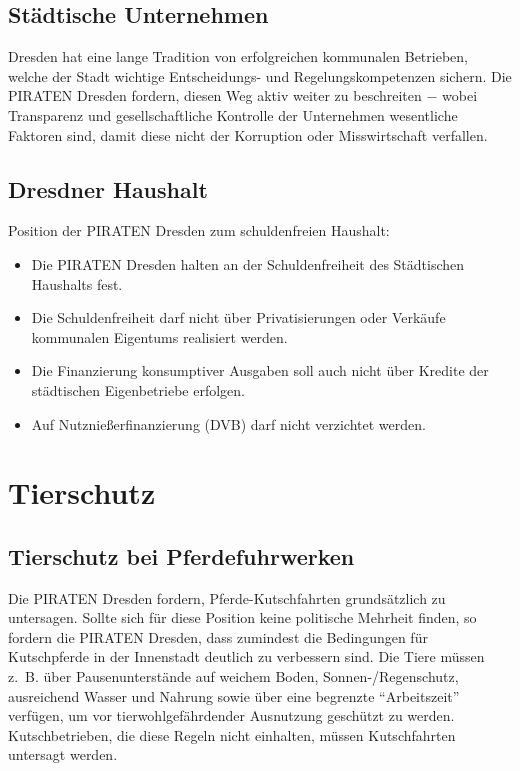 \documentclass[a4paper, 11pt]{article}
\begin{document}
\subsection{Städtische Unternehmen}
Dresden hat eine lange Tradition von erfolgreichen kommunalen Betrieben, welche der Stadt wichtige Entscheidungs- und Regelungskompetenzen sichern. Die PIRATEN Dresden fordern, diesen Weg aktiv weiter zu beschreiten $-$ wobei Transparenz und gesellschaftliche Kontrolle der Unternehmen wesentliche Faktoren sind, damit diese nicht der Korruption oder Misswirtschaft verfallen.


\subsection{Dresdner Haushalt}

Position der PIRATEN Dresden zum schuldenfreien Haushalt:

\begin{itemize}
    \item Die PIRATEN Dresden halten an der Schuldenfreiheit des Städtischen Haushalts fest.
    \item Die Schuldenfreiheit darf nicht über Privatisierungen oder Verkäufe kommunalen Eigentums realisiert werden.
    \item Die Finanzierung konsumptiver Ausgaben soll auch nicht über Kredite der städtischen Eigenbetriebe erfolgen.
    \item Auf Nutznießerfinanzierung (DVB) darf nicht verzichtet werden.
\end{itemize}

\section{Tierschutz}

\subsection{Tierschutz bei Pferdefuhrwerken}
Die PIRATEN Dresden fordern, Pferde-Kutschfahrten grundsätzlich zu untersagen. Sollte sich für diese Position keine politische Mehrheit finden, so fordern die PIRATEN Dresden, dass zumindest die Bedingungen für Kutschpferde in der Innenstadt deutlich zu verbessern sind. Die Tiere müssen z. B. über Pausenunterstände auf weichem Boden, Sonnen-/Regenschutz, ausreichend Wasser und Nahrung sowie über eine begrenzte ``Arbeitszeit'' verfügen, um vor tierwohlgefährdender Ausnutzung geschützt zu werden. Kutschbetrieben, die diese Regeln nicht einhalten, müssen Kutschfahrten untersagt werden.
\end{document}
